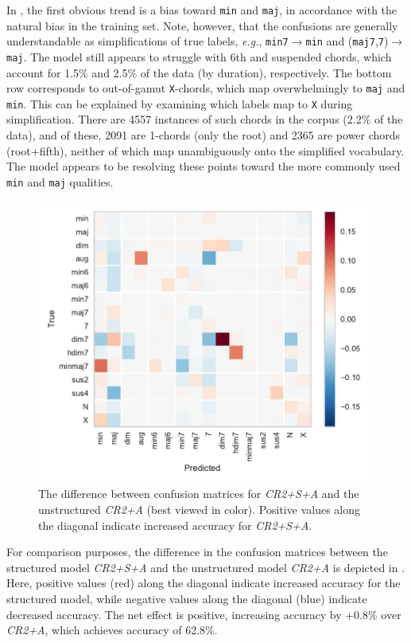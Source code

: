\documentclass{article}
\def\eg{\emph{e.g.}}
\begin{document}
In , the first obvious trend is a bias toward \texttt{min} and \texttt{maj}, in accordance with the natural bias in the training set.
Note, however, that the confusions are generally understandable as simplifications of true labels, \eg, \texttt{min7}$\rightarrow$\texttt{min} and (\texttt{maj7},\texttt{7})$\rightarrow$\texttt{maj}.
The model still appears to struggle with 6th and suspended chords, which account for 1.5\% and 2.5\% of the data (by duration), respectively.
The bottom row corresponds to out-of-gamut \texttt{X}-chords, which map overwhelmingly to \texttt{maj} and \texttt{min}.
This can be explained by examining which labels map to \texttt{X} during simplification.
There are 4557 instances of such chords in the corpus (2.2\% of the data), and of these, 2091 are 1-chords (only the root) and 2365 are power chords (root+fifth), neither of which map unambiguously onto the simplified vocabulary.
The model appears to be resolving these points toward the more commonly used \texttt{min} and \texttt{maj} qualities.

\begin{figure}
    \centering
    \includegraphics[width=\columnwidth]{confdelta}
    \caption{The difference between confusion matrices for \emph{CR2+S+A} and the unstructured \emph{CR2+A} (best viewed in color).
    Positive values along the diagonal indicate increased accuracy for \emph{CR2+S+A}.\label{fig:confdelta}}
\end{figure}

For comparison purposes, the difference in the confusion matrices between the structured model \emph{CR2+S+A} and the unstructured model \emph{CR2+A} is depicted in .
Here, positive values (red) along the diagonal indicate increased accuracy for the structured model, while negative values along the diagonal (blue) indicate decreased accuracy.
The net effect is positive, increasing accuracy by +0.8\% over \emph{CR2+A}, which achieves accuracy of 62.8\%.
\end{document}
